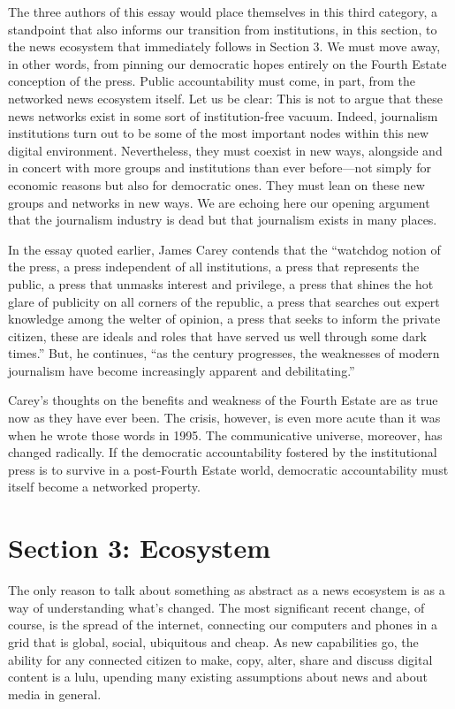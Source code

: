 The three authors of this essay would place themselves in this third category,
a standpoint that also informs our transition from institutions, in this section,
to the news ecosystem that immediately follows in Section 3. We must move
away, in other words, from pinning our democratic hopes entirely on the Fourth Estate conception of the press. Public accountability must come, in part, from the
networked news ecosystem itself. Let us be clear: This is not to argue that these
news networks exist in some sort of institution-free vacuum. Indeed, journalism
institutions turn out to be some of the most important nodes within this new
digital environment. Nevertheless, they must coexist in new ways, alongside and
in concert with more groups and institutions than ever before—not simply for
economic reasons but also for democratic ones. They must lean on these new
groups and networks in new ways. We are echoing here our opening argument
that the journalism industry is dead but that journalism exists in many places.

In the essay quoted earlier, James Carey contends that the ``watchdog notion of
the press, a press independent of all institutions, a press that represents the public,
a press that unmasks interest and privilege, a press that shines the hot glare of
publicity on all corners of the republic, a press that searches out expert knowledge
among the welter of opinion, a press that seeks to inform the private citizen,
these are ideals and roles that have served us well through some dark times.'' But,
he continues, ``as the century progresses, the weaknesses of modern journalism
have become increasingly apparent and debilitating.''

Carey’s thoughts on the benefits and weakness of the Fourth Estate are as true
now as they have ever been. The crisis, however, is even more acute than it was
when he wrote those words in 1995. The communicative universe, moreover, has
changed radically. If the democratic accountability fostered by the institutional
press is to survive in a post-Fourth Estate world, democratic accountability must
itself become a networked property.

\chapter{Section 3: Ecosystem}
The only reason to talk about something as abstract as a news ecosystem is as
a way of understanding what’s changed. The most significant recent change, of
course, is the spread of the internet, connecting our computers and phones in a
grid that is global, social, ubiquitous and cheap. As new capabilities go, the ability
for any connected citizen to make, copy, alter, share and discuss digital content is a
lulu, upending many existing assumptions about news and about media in general.

